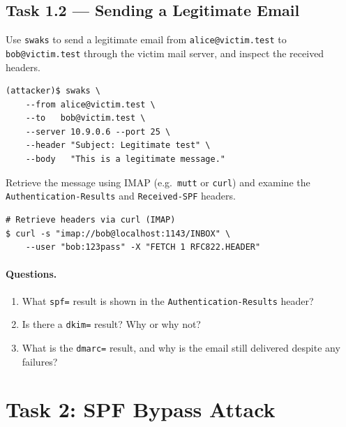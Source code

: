 \documentclass[11pt]{article}
\begin{document}
\subsection{Task 1.2 --- Sending a Legitimate Email}

Use \texttt{swaks} to send a legitimate email from
\texttt{alice@victim.test} to \texttt{bob@victim.test} through the
victim mail server, and inspect the received headers.

\begin{listing}[H]
\begin{verbatim}
(attacker)$ swaks \
    --from alice@victim.test \
    --to   bob@victim.test \    
    --server 10.9.0.6 --port 25 \
    --header "Subject: Legitimate test" \
    --body   "This is a legitimate message."
\end{verbatim}
\end{listing}

Retrieve the message using IMAP (e.g.\ \texttt{mutt} or \texttt{curl})
and examine the \texttt{Authentication-Results} and
\texttt{Received-SPF} headers.

\begin{listing}[H]
\begin{verbatim}
# Retrieve headers via curl (IMAP)
$ curl -s "imap://bob@localhost:1143/INBOX" \
    --user "bob:123pass" -X "FETCH 1 RFC822.HEADER"
\end{verbatim}
\end{listing}

\paragraph{Questions.}
\begin{enumerate}[noitemsep]
  \item What \texttt{spf=} result is shown in the
    \texttt{Authentication-Results} header?
  \item Is there a \texttt{dkim=} result? Why or why not?
  \item What is the \texttt{dmarc=} result, and why is the email still
    delivered despite any failures?
\end{enumerate}

\section{Task 2: SPF Bypass Attack}
\end{document}
